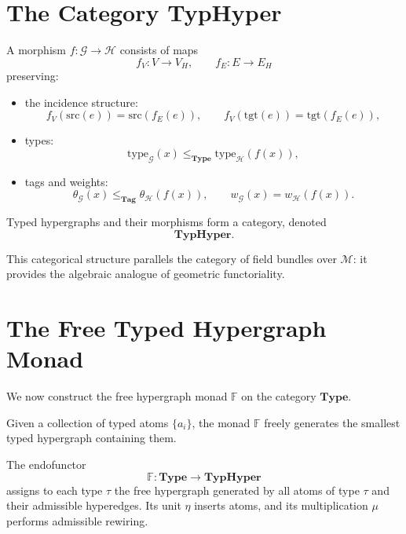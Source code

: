 \section{The Category TypHyper}

\begin{definition}
A morphism $f : \mathcal{G} \to \mathcal{H}$ consists of maps
\[
f_V : V \to V_{\!H},
\qquad
f_E : E \to E_{\!H}
\]
preserving:
\begin{itemize}
\item the incidence structure:
  \[
    f_V(\mathrm{src}(e)) = \mathrm{src}(f_E(e)),\qquad
    f_V(\mathrm{tgt}(e)) = \mathrm{tgt}(f_E(e)),
  \]
\item types:
  \[
  \mathrm{type}_{\mathcal{G}}(x) \le_{\mathbf{Type}}
    \mathrm{type}_{\mathcal{H}}(f(x)),
  \]
\item tags and weights:
  \[
  \theta_{\mathcal{G}}(x) \le_{\mathbf{Tag}} \theta_{\mathcal{H}}(f(x)),
  \qquad
  w_{\mathcal{G}}(x) = w_{\mathcal{H}}(f(x)).
  \]
\end{itemize}
\end{definition}

\begin{proposition}
Typed hypergraphs and their morphisms form a category, denoted
\[
\mathbf{TypHyper}.
\]
\end{proposition}

This categorical structure parallels the category of field bundles over
$\mathcal{M}$: it provides the algebraic analogue of geometric functoriality.

\section{The Free Typed Hypergraph Monad}

We now construct the free hypergraph monad $\mathbb{F}$ on the category
$\mathbf{Type}$.

Given a collection of typed atoms $\{a_i\}$, the monad $\mathbb{F}$ freely
generates the smallest typed hypergraph containing them.

\begin{definition}
The endofunctor
\[
\mathbb{F}: \mathbf{Type} \to \mathbf{TypHyper}
\]
assigns to each type $\tau$ the free hypergraph generated by all atoms of type
$\tau$ and their admissible hyperedges.  Its unit $\eta$ inserts atoms, and its
multiplication $\mu$ performs admissible rewiring.
\end{definition}

